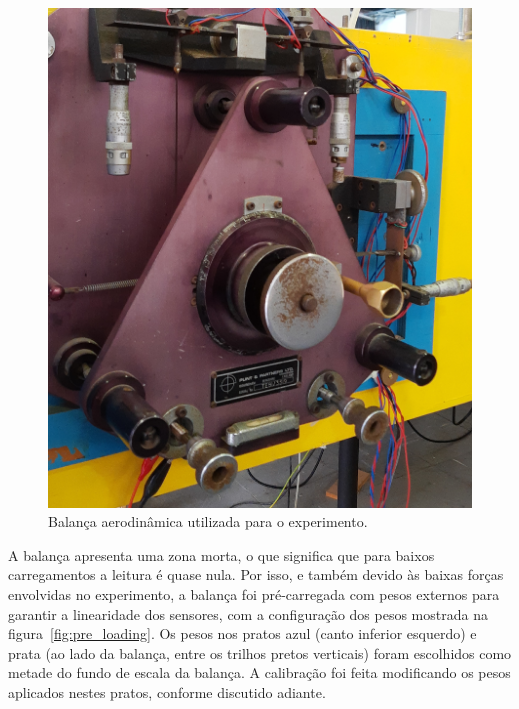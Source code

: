 \begin{figure}[htbp]
    \centering
    \includegraphics[width=\textwidth]{img/eixocropped.jpg}
    \caption{Balança aerodinâmica utilizada para o experimento.}\label{fig:3axis_scale}
\end{figure}

A balança apresenta uma zona morta, o que significa que para baixos carregamentos a leitura é quase nula. Por isso, e também devido às baixas forças envolvidas no experimento, a balança foi pré-carregada com pesos externos para garantir a linearidade dos sensores, com a configuração dos pesos mostrada na figura~\ref{fig:pre_loading}. Os pesos nos pratos azul (canto inferior esquerdo) e prata (ao lado da balança, entre os trilhos pretos verticais) foram escolhidos como metade do fundo de escala da balança. A calibração foi feita modificando os pesos aplicados nestes pratos, conforme discutido adiante.

